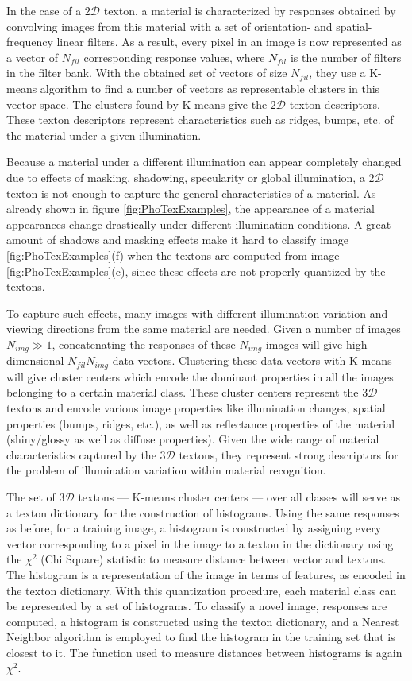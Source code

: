 In the case of a $2\mathcal{D}$ texton, a material is characterized by responses obtained by convolving images from this material with a set of orientation- and spatial-frequency linear filters. As a result, every pixel in an image is now represented as a vector of $N_{fil}$ corresponding response values, where $N_{fil}$ is the number of filters in the filter bank. With the obtained set of vectors of size $N_{fil}$, they use a K-means algorithm to find a number of vectors as representable clusters in this vector space. The clusters found by K-means give the $2\mathcal{D}$ texton descriptors. These texton descriptors represent characteristics such as ridges, bumps, etc. of the material under a given illumination.

Because a material under a different illumination can appear completely changed due to effects of masking, shadowing, specularity or global illumination, a $2\mathcal{D}$ texton is not enough to capture the general characteristics of a material. As already shown in figure \ref{fig:PhoTexExamples}, the appearance of a material appearances change drastically under different illumination conditions. A great amount of shadows and masking effects make it hard to classify image \ref{fig:PhoTexExamples}(f) when the textons are computed from image \ref{fig:PhoTexExamples}(c), since these effects are not properly quantized by the textons. 

To capture such effects, many images with different illumination variation and viewing directions from the same material are needed. Given a number of images $N_{img} \gg 1$,  concatenating the responses of these $N_{img}$ images will give high dimensional $N_{fil}N_{img}$ data vectors. Clustering these data vectors with K-means will give cluster centers which encode the dominant properties in all the images belonging to a certain material class. These cluster centers represent the $3\mathcal{D}$ textons and encode various image properties like illumination changes, spatial properties (bumps, ridges, etc.), as well as reflectance properties of the material (shiny/glossy as well as diffuse properties). Given the wide range of material characteristics captured by the $3\mathcal{D}$ textons, they represent strong descriptors for the problem of illumination variation within material recognition.

The set of $3\mathcal{D}$ textons --- K-means cluster centers --- over all classes will serve as a texton dictionary for the construction of histograms. Using the same responses as before, for a training image, a histogram is constructed by assigning every vector corresponding to a pixel in the image to a texton in the dictionary using the $\chi^2$ (Chi Square) statistic to measure distance between vector and textons. The histogram is a representation of the image in terms of features, as encoded in the texton dictionary. With this quantization procedure, each material class can be represented by a set of histograms. To classify a novel image, responses are computed, a histogram is constructed using the texton dictionary, and a Nearest Neighbor algorithm is employed to find the histogram in the training set that is closest to it. The function used to measure distances between histograms is again $\chi^2$.

